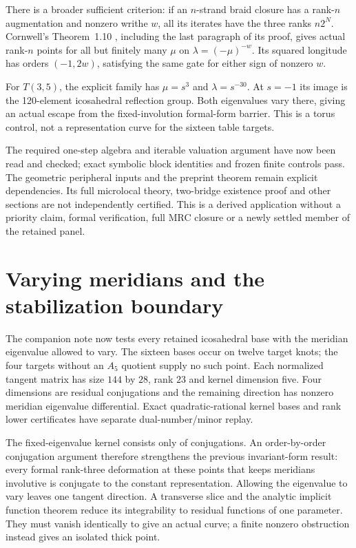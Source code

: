 \documentclass[11pt]{article}
\begin{document}
There is a broader sufficient criterion: if an $n$-strand braid
closure has a rank-$n$ augmentation and nonzero writhe $w$, all
its iterates have the three ranks $n2^N$. Cornwell's
Theorem~1.10 \cite{cornwell17}, including the last paragraph of its
proof, gives actual rank-$n$ points for all but finitely many
$\mu$ on $\lambda=(-\mu)^{-w}$. Its squared longitude has orders
$(-1,2w)$, satisfying the same gate for either sign of nonzero $w$.

For $T(3,5)$, the explicit family has $\mu=s^3$ and
$\lambda=s^{-30}$. At $s=-1$ its image is the 120-element
icosahedral reflection group. Both eigenvalues vary there, giving
an actual escape from the fixed-involution formal-form barrier.
This is a torus control, not a representation curve for the sixteen
table targets.

The required one-step algebra and iterable valuation argument have
now been read and checked; exact symbolic block identities and
frozen finite controls pass. The geometric peripheral inputs and
the preprint theorem remain explicit dependencies. Its full
microlocal theory, two-bridge existence proof and other sections
are not independently certified. This is a derived application
without a priority claim, formal verification, full MRC closure
or a newly settled member of the retained panel.

\clearpage
\section{Varying meridians and the stabilization boundary}

The companion note
 now tests every
retained icosahedral base with the meridian eigenvalue allowed to
vary. The sixteen bases occur on twelve target knots; the four
targets without an $A_5$ quotient supply no such point.
Each normalized tangent matrix has size $144$ by $28$, rank $23$
and kernel dimension five. Four dimensions are residual
conjugations and the remaining direction has nonzero meridian
eigenvalue differential. Exact quadratic-rational kernel bases and
rank lower certificates have separate dual-number/minor replay.

The fixed-eigenvalue kernel consists only of conjugations. An
order-by-order conjugation argument therefore strengthens the
previous invariant-form result: every formal rank-three deformation
at these points that keeps meridians involutive is conjugate to the
constant representation. Allowing the eigenvalue to vary leaves
one tangent direction. A transverse slice and the analytic implicit
function theorem reduce its integrability to residual functions of
one parameter. They must vanish identically to give an actual curve;
a finite nonzero obstruction instead gives an isolated thick point.
\end{document}
